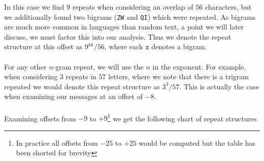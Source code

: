   In this case we find $9$ repeats when considering an overlap of
  $56$ characters, but we additionally found two bigrams (\texttt{ZW}
  and \texttt{QI}) which were repeated. As bigrams are much more
  common in languages than random text, a point we will later
  discuss, we must factor this into our analysis. Thus we denote the
  repeat structure at this offset as $9^{\texttt{xx}}/56$, where each
  $\texttt{x}$ denotes a bigram.\\\\For any other $n$-gram repeat, we
  will use the $n$ in the exponent. For example, when considering $3$
  repeats in $57$ letters, where we note that there is a trigram
  repeated we would denote this repeat structure as $3^{3}/57$. This
  is actually the case when examining our messages at an offset of $-8$.
  \\\\Examining offsets from $-9$ to $+9$\footnote{In practice all
    offsets from $-25$ to $+25$ would be computed but the table has
  been shorted for brevity} we get the following chart of repeat structures
